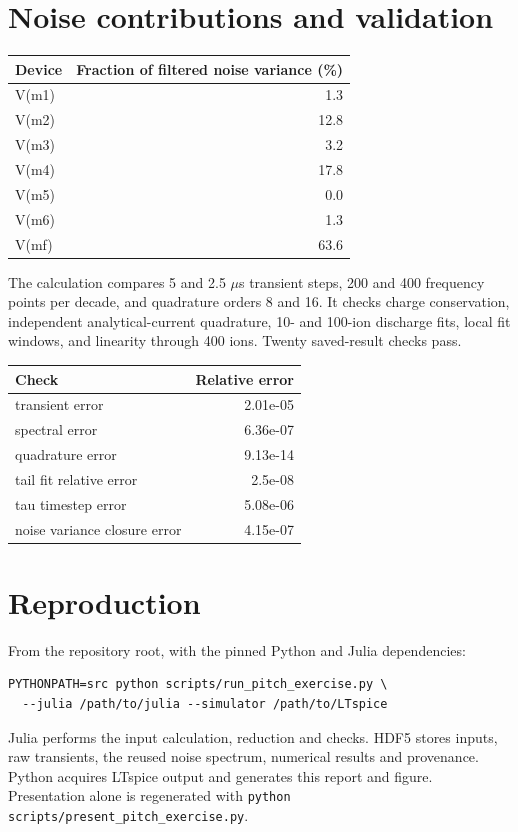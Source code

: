 \documentclass[11pt,a4paper]{article}
\begin{document}
\section{Noise contributions and validation}
\begin{center}\begin{tabular}{lr}\toprule
Device & Fraction of filtered noise variance (\%)\\\midrule
V(m1) & 1.3 \\
V(m2) & 12.8 \\
V(m3) & 3.2 \\
V(m4) & 17.8 \\
V(m5) & 0.0 \\
V(m6) & 1.3 \\
V(mf) & 63.6 \\
\bottomrule\end{tabular}\end{center}
The calculation compares 5 and 2.5 $\mu$s transient steps, 200 and 400 frequency
points per decade, and quadrature orders 8 and 16. It checks charge conservation,
independent analytical-current quadrature, 10- and 100-ion discharge fits,
local fit windows, and linearity through 400 ions. Twenty saved-result checks pass.
\begin{center}\begin{tabular}{lr}\toprule
Check & Relative error\\\midrule
transient error & 2.01e-05 \\
spectral error & 6.36e-07 \\
quadrature error & 9.13e-14 \\
tail fit relative error & 2.5e-08 \\
tau timestep error & 5.08e-06 \\
noise variance closure error & 4.15e-07 \\
\bottomrule\end{tabular}\end{center}

\section{Reproduction}
From the repository root, with the pinned Python and Julia dependencies:
\begin{verbatim}
PYTHONPATH=src python scripts/run_pitch_exercise.py \
  --julia /path/to/julia --simulator /path/to/LTspice
\end{verbatim}
Julia performs the input calculation, reduction and checks. HDF5 stores inputs,
raw transients, the reused noise spectrum, numerical results and provenance.
Python acquires LTspice output and generates this report and figure. Presentation
alone is regenerated with \texttt{python scripts/present\_pitch\_exercise.py}.
\end{document}

